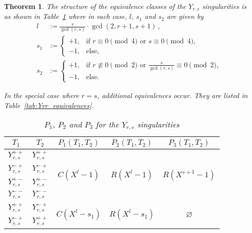 \documentclass[noend]{amsproc}
\newtheorem{theorem}{Theorem}
\theoremstyle{definition}
\begin{document}
\begin{theorem}
The structure of the equivalence classes of the $Y_{r,s}$ singularities is as
shown in Table~\ref{tab:Yrs_equivalences} where in each case, $l$, $s_1$ and
$s_2$ are given by
\begin{align*}
l &:= \frac{r}{\gcd(r,s)} \cdot \gcd(2, r+1, s+1) \,, \\
s_1 &:=
\begin{cases}
  +1,  &\text{if } r \equiv 0 \pmod{4} \text{ or } s \equiv 0 \pmod{4}, \\
  -1, &\text{else,}
\end{cases} \\
s_2 &:=
\begin{cases}
  +1,  &\text{if } r \not\equiv 0 \pmod{2}
      \text{ or } \frac{s}{\gcd(r,s)} \equiv 0 \pmod{2}, \\
  -1, &\text{else.}
\end{cases}
\end{align*}

In the special case where $r = s$, additional equivalences occur. They are
listed in Table~\ref{tab:Yrr_equivalences}.

\begin{table}[htb]
\centering
\caption{$P_1$, $P_2$ and $P_3$ for the $Y_{r,s}$ singularities}
\label{tab:Yrs_equivalences}
\begin{tabular}{|c|c||c|c|c|}
\hline

$T_1$ & $T_2$ & $P_1(T_1, T_2)$ & $P_2(T_1, T_2)$ & $P_3(T_1, T_2)$ \\
\hline\hline

$Y_{r,s}^{++}$ & $Y_{r,s}^{++}$ &
\multirow{4}{*}{$C(X^l-1)$} &
\multirow{4}{*}{$R(X^l-1)$} &
\multirow{4}{*}{$R(X^{s+1}-1)$}
\\ \cline{1-2}

$Y_{r,s}^{-+}$ & $Y_{r,s}^{-+}$ &&&
\\ \cline{1-2}

$Y_{r,s}^{+-}$ & $Y_{r,s}^{+-}$ &&&
\\ \cline{1-2}

$Y_{r,s}^{--}$ & $Y_{r,s}^{--}$ &&&
\\ \hline


$Y_{r,s}^{++}$ & $Y_{r,s}^{-+}$ &
\multirow{4}{*}{$C(X^l-s_1)$} &
\multirow{4}{*}{$R(X^l-s_1)$} &
\multirow{4}{*}{$\varnothing$}
\\ \cline{1-2}

$Y_{r,s}^{-+}$ & $Y_{r,s}^{++}$ &&&
\\ \cline{1-2}


\end{tabular}
\end{table}
\end{theorem}
\end{document}
